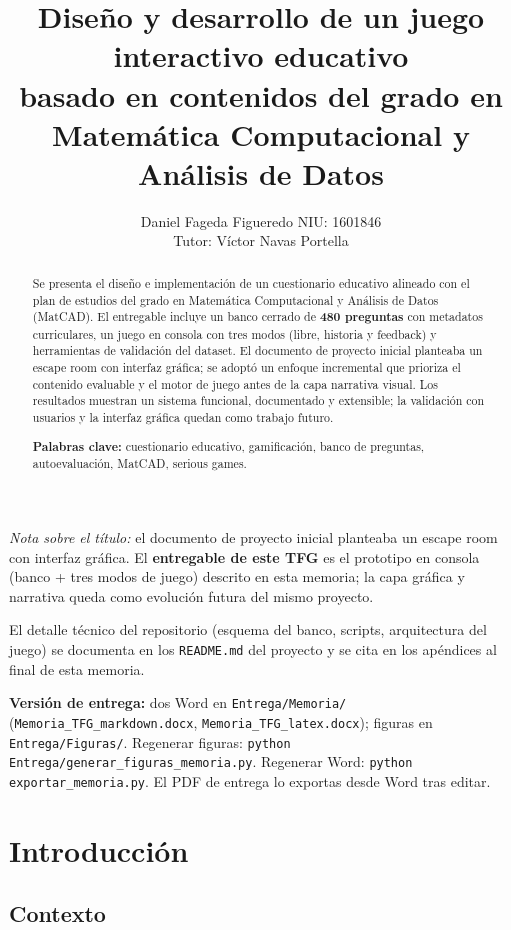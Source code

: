\documentclass[11pt,a4paper]{article}
\title{Diseño y desarrollo de un juego interactivo educativo\\basado en contenidos del grado en Matemática Computacional y Análisis de Datos}
\author{%
  Daniel Fageda Figueredo \quad NIU: 1601846\\
  Tutor: Víctor Navas Portella
}
\date{}
\begin{document}
\maketitle

\noindent\textit{Nota sobre el título:} el documento de proyecto inicial planteaba un escape room con interfaz gráfica. El \textbf{entregable de este TFG} es el prototipo en consola (banco + tres modos de juego) descrito en esta memoria; la capa gráfica y narrativa queda como evolución futura del mismo proyecto.

\smallskip
\noindent El detalle técnico del repositorio (esquema del banco, scripts, arquitectura del juego) se documenta en los \texttt{README.md} del proyecto y se cita en los apéndices al final de esta memoria.

\smallskip
\noindent\textbf{Versión de entrega:} dos Word en \texttt{Entrega/Memoria/} (\texttt{Memoria\_TFG\_markdown.docx}, \texttt{Memoria\_TFG\_latex.docx}); figuras en \texttt{Entrega/Figuras/}. Regenerar figuras: \texttt{python Entrega/generar\_figuras\_memoria.py}. Regenerar Word: \texttt{python exportar\_memoria.py}. El PDF de entrega lo exportas desde Word tras editar.

\begin{abstract}
\noindent Se presenta el diseño e implementación de un cuestionario educativo alineado con el plan de estudios del grado en Matemática Computacional y Análisis de Datos (MatCAD). El entregable incluye un banco cerrado de \textbf{480 preguntas} con metadatos curriculares, un juego en consola con tres modos (libre, historia y feedback) y herramientas de validación del dataset. El documento de proyecto inicial planteaba un escape room con interfaz gráfica; se adoptó un enfoque incremental que prioriza el contenido evaluable y el motor de juego antes de la capa narrativa visual. Los resultados muestran un sistema funcional, documentado y extensible; la validación con usuarios y la interfaz gráfica quedan como trabajo futuro.

\medskip
\noindent\textbf{Palabras clave:} cuestionario educativo, gamificación, banco de preguntas, autoevaluación, MatCAD, serious games.
\end{abstract}

\section{Introducción}

\subsection{Contexto}
\end{document}
